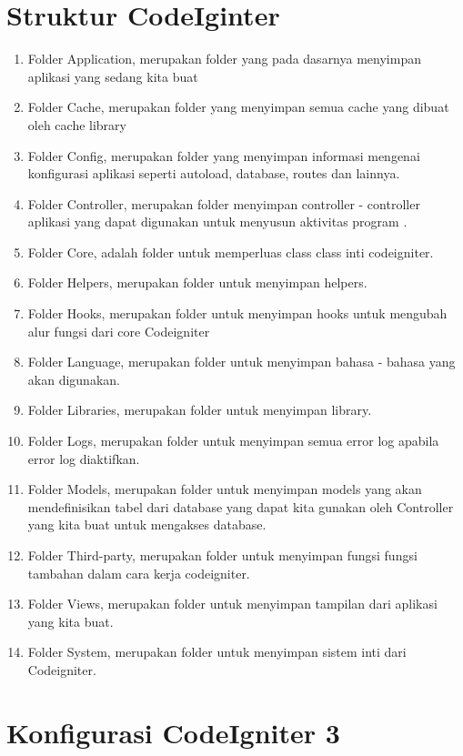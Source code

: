 \section{Struktur CodeIginter}
\begin{enumerate}
	\item Folder Application, merupakan folder yang pada dasarnya menyimpan aplikasi yang sedang kita buat
	\item Folder Cache, merupakan folder yang menyimpan semua cache yang dibuat oleh cache library
	\item Folder Config, merupakan folder yang menyimpan informasi mengenai konfigurasi aplikasi seperti autoload, database, routes dan lainnya.
	\item Folder Controller, merupakan folder menyimpan controller - controller aplikasi yang dapat digunakan untuk menyusun aktivitas program .
	\item Folder Core, adalah folder untuk memperluas class class inti codeigniter.
	\item Folder Helpers, merupakan folder untuk menyimpan helpers.
	\item Folder Hooks, merupakan folder untuk menyimpan hooks untuk mengubah alur fungsi dari core Codeigniter
	\item Folder Language, merupakan folder untuk menyimpan bahasa - bahasa yang akan digunakan.
	\item Folder Libraries, merupakan folder untuk menyimpan library.
	\item Folder Logs, merupakan folder untuk menyimpan semua error log apabila error log diaktifkan.
	\item Folder Models, merupakan folder untuk menyimpan models yang akan mendefinisikan tabel dari database yang dapat kita gunakan oleh Controller yang kita buat untuk mengakses database.
	\item Folder Third-party, merupakan folder untuk menyimpan fungsi fungsi tambahan dalam cara kerja codeigniter.
	\item Folder Views, merupakan folder untuk menyimpan tampilan dari aplikasi yang kita buat.
	\item Folder System, merupakan folder untuk menyimpan sistem inti dari Codeigniter.
\end{enumerate}

\section{Konfigurasi CodeIgniter 3}
